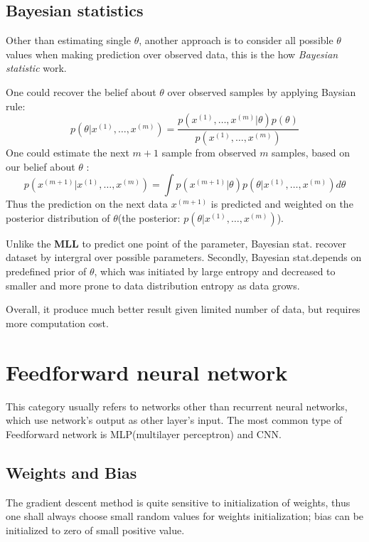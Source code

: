 \documentclass{article}
\begin{document}
\subsection*{Bayesian statistics}
Other than estimating single $\theta$, another approach is to consider all possible $\theta$ values when making prediction over observed data, this is the how \textit{Bayesian statistic} work. \par
One could recover the belief about $\theta$ over observed samples by applying Baysian rule:
\begin{equation}
    p(\theta|x^{(1)},\dots,x^{(m)}) = \frac{p(x^{(1)},\dots,x^{(m)}|\theta)p(\theta)}{p(x^{(1)},\dots,x^{(m)})}
\end{equation}
One could estimate the next $m+1$ sample from observed $m$ samples, based on our belief about $\theta$ :
\begin{equation}
    p(x^{(m+1)}|x^{(1)},\dots,x^{(m)}) = \int p(x^{(m+1)}|\theta)p(\theta|x^{(1)},\dots,x^{(m)})d\theta
\end{equation}
Thus the prediction on the next data $x^{(m+1)}$ is predicted and weighted on the posterior distribution of $\theta$(the posterior: $p(\theta|x^{(1)},\dots,x^{(m)})$).\par
Unlike the \textbf{MLL} to predict one point of the parameter, Bayesian stat. recover dataset by intergral over possible parameters. Secondly, Bayesian stat.depends on predefined prior of $\theta$, which was initiated by large entropy and decreased to smaller and more prone to data distribution entropy as data grows.\par
Overall, it produce much better result given limited number of data, but requires more computation cost.

\section{Feedforward neural network}
This category usually refers to networks other than recurrent neural networks, which use network's output as other layer's input. The most common type of Feedforward network is MLP(multilayer perceptron) and CNN.

\subsection{Weights and Bias}
The gradient descent method is quite sensitive to initialization of weights, thus one shall always choose small random values for weights initialization; bias can be initialized to zero of small positive value.
\end{document}
